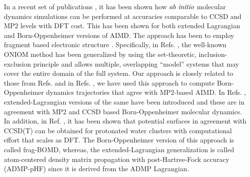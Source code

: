 In a recent set of publications \cite{fragAIMD,fragAIMD-elbo}, it
has been shown how $\it{ab~ initio}$ molecular dynamics simulations can be performed
at accuracies comparable to CCSD and MP2 levels with DFT cost. This has been
shown for both extended Lagrangian and
Born-Oppenheimer versions of AIMD. The approach has been to employ fragment
based electronic
structure \cite{morokuma-review1,Raghavachari-review,morokuma-review2,collins-review,
gordon-review,Weitao-DAC,oniom,oniomxs,EFP,FMO-feature-article,mfcc,
ee-mbe-water,ee-mbe,gebf,LS3DF,mta,ONIOM-XO,mim,mob,herbert-gmbe-1,
herbert-gmbe,Hirata-Fragments,Hirata-Fragments-2,gordon-fmo-dynamics2,
gordon-dynamics-1,cfm,Gao-XPol}. Specifically, in
Refs. \cite{fragAIMD,fragAIMD-elbo,fragAIMD-CC}, the well-known ONIOM
method \cite{oniom} has been generalized by using the set-theoretic,
inclusion-exclusion principle \cite{pie} and allows multiple, overlapping
``model'' systems that may cover the entire domain of the full
system. Our approach is closely related to those from
Refs. \cite{mim,mta,ONIOM-XO} and in
Refs. \cite{fragAIMD,fragAIMD-elbo}, we have used this approach to
compute Born-Oppenheimer dynamics trajectories that agree with MP2-based
AIMD. In Refs. \cite{fragAIMD-elbo,fragAIMD-CC}, extended-Lagrangian versions 
of the same have been introduced and these are in agreement with MP2 and
CCSD based Born-Oppenheimer molecular dynamics. In addition, in
Ref. \cite{fragAIMD,fragAIMD-elbo}, it has been shown that potential
surfaces in agreement with CCSD(T) can be obtained for protonated water
clusters with computational effort that scales as DFT. The Born-Oppenheimer
version of this approach is called frag-BOMD, whereas, the extended-Lagrangian
generalization is called atom-centered density matrix propagation with
post-Hartree-Fock accuracy (ADMP-pHF) since it is derived from the
ADMP \cite{admp1,admp2,admp3,admp4} Lagrangian.

